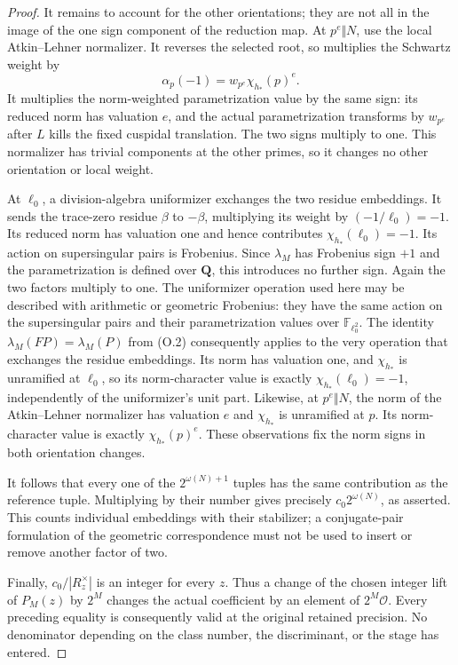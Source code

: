 \begin{proof}
It remains to account for the other orientations; they are not
all in the image of the one sign component of the reduction map.
At $p^e\Vert N$, use the local Atkin--Lehner normalizer. It
reverses the selected root, so multiplies the Schwartz weight by
\[
              \alpha_p(-1)=w_{p^e}\chi_{h_*}(p)^e.
\]
It multiplies the norm-weighted parametrization value by the same
sign: its reduced norm has valuation $e$, and the actual
parametrization transforms by $w_{p^e}$ after $L$ kills the fixed
cuspidal translation. The two signs multiply to one. This
normalizer has trivial components at the other primes, so it
changes no other orientation or local weight.

At $\ell_0$, a division-algebra uniformizer exchanges the two
residue embeddings. It sends the trace-zero residue $\beta$ to
$-\beta$, multiplying its weight by $(-1/\ell_0)=-1$. Its
reduced norm has valuation one and hence contributes
$\chi_{h_*}(\ell_0)=-1$. Its action on supersingular pairs is
Frobenius. Since $\lambda_M$ has Frobenius sign $+1$ and the
parametrization is defined over $\mathbf Q$, this introduces no
further sign. Again the two factors multiply to one.
The uniformizer operation used here may be described with arithmetic
or geometric Frobenius: they have the same action on the supersingular
pairs and their parametrization values over $\mathbb F_{\ell_0^2}$.
The identity $\lambda_M(FP)=\lambda_M(P)$ from (O.2) consequently
applies to the very operation that exchanges the residue embeddings.
Its norm has valuation one, and $\chi_{h_*}$ is unramified at
$\ell_0$, so its norm-character value is exactly
$\chi_{h_*}(\ell_0)=-1$, independently of the uniformizer's unit part.
Likewise, at $p^e\Vert N$, the norm of the Atkin--Lehner normalizer
has valuation $e$ and $\chi_{h_*}$ is unramified at $p$. Its
norm-character value is exactly $\chi_{h_*}(p)^e$. These observations
fix the norm signs in both orientation changes.


It follows that every one of the $2^{\omega(N)+1}$ tuples has
the same contribution as the reference tuple. Multiplying by
their number gives precisely $c_0 2^{\omega(N)}$, as asserted.
This counts individual embeddings with their stabilizer; a
conjugate-pair formulation of the geometric correspondence must
not be used to insert or remove another factor of two.

Finally, $c_0/|R_z^\times|$ is an integer for every $z$. Thus a
change of the chosen integer lift of $P_M(z)$ by $2^M$ changes
the actual coefficient by an element of $2^M\mathcal O$.
Every preceding equality is consequently valid at the original
retained precision. No denominator depending on the class number,
the discriminant, or the stage has entered.

\end{proof}
